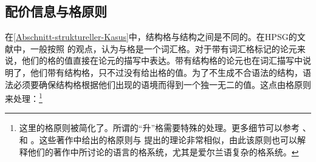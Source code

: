 \subsection{配价信息与格原则}

在\ref{Abschnitt-struktureller-Kasus}中，结构格与结构之间是不同的。在HPSG的文献中，一般按照 \citet{Haider86}的观点，认为与格是一个词汇格。对于带有词汇格标记的论元来说，他们的格的值直接在论元的描写中表达。带有结构格的论元也在词汇描写中说明了，他们带有结构格，只不过没有给出格的值。为了不生成不合语法的结构，语法必须要确保结构格根据他们出现的语境而得到一个独一无二的值。这点由格原则来处理：\footnote{%
这里的格原则被简化了。所谓的“升”格需要特殊的处理。更多细节可以参考 、 和 。这些著作中给出的格原则与 \citet*{YMJ87}提出的理论非常相似，由此该原则也可以解释他们的著作中所讨论的语言的格系统，尤其是爱尔兰语复杂的格系统。
}
